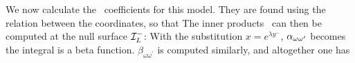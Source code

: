 We now calculate the \Bog\ coefficients for this model.
 They are found using the relation between the coordinates,
%
\eqn{}
%
so that
%
\eqn{}
%
%
The inner products \bogc\ can then be computed at the null surface
${\cal I}_L^-$:
%
\eqn{}
%
With the substitution $x=e^{\lambda y^-}$, $\alpha_{\omega\omega'}$ becomes
%
\eqn{}
%
the integral is a beta function.
$\beta_{\omega\omega^{\prime}}$ is
computed similarly, and altogether one has
%
\eqn{}
